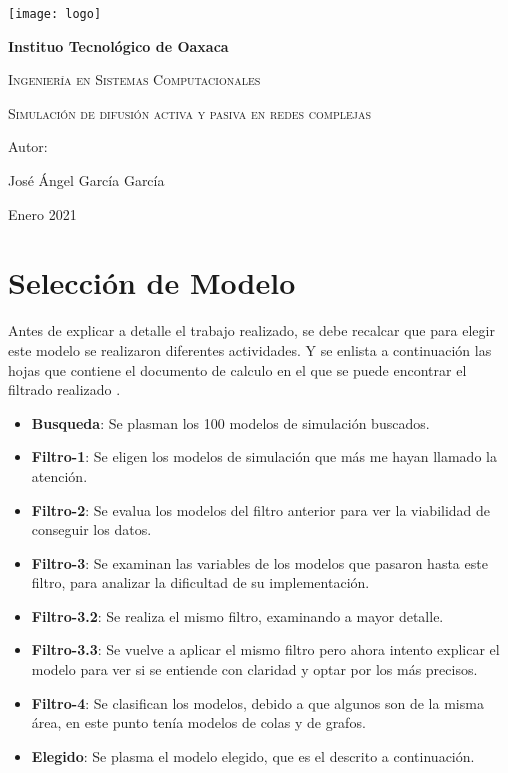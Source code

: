 \documentclass{article}
\begin{document}
		
	\begin{titlepage}
		\centering
		{\texttt{[image: logo]}\par}
		\vspace{1cm}
		{\bfseries\LARGE Instituo Tecnológico de Oaxaca \par}
		\vspace{1cm}
		{\scshape\Large Ingeniería en Sistemas Computacionales  \par}
		\vspace{1cm}
		{\scshape\Huge Simulación de difusión activa y pasiva en redes
			complejas \par}
		\vspace{3cm}
		\vfill
		{\Large Autor: \par}
		{\Large José Ángel García García \par}
		\vfill
		{\Large Enero 2021 \par}
		\end{titlepage}
	
\tableofcontents
\newpage
	
\section{Selección de Modelo}	
Antes de explicar a detalle el trabajo realizado, se debe recalcar que para elegir este modelo se realizaron diferentes actividades. Y se enlista a continuación las hojas que contiene el documento de calculo en el que se puede encontrar el filtrado realizado \cite{filtros:2020}.
\begin{itemize}
	\item \textbf{Busqueda}: Se plasman los 100 modelos de simulación buscados.
	\item \textbf{Filtro-1}: Se eligen los modelos de simulación que más me hayan llamado la atención.
	\item \textbf{Filtro-2}: Se evalua los modelos del filtro anterior para ver la viabilidad de conseguir los datos.
	\item \textbf{Filtro-3}: Se examinan las variables de los modelos que pasaron hasta este filtro, para analizar la dificultad de su implementación.
	\item \textbf{Filtro-3.2}: Se realiza el mismo filtro, examinando a mayor detalle.
	\item \textbf{Filtro-3.3}: Se vuelve a aplicar el mismo filtro pero ahora intento explicar el modelo para ver si se entiende con claridad y optar por los más precisos.
	\item \textbf{Filtro-4}: Se clasifican los modelos, debido a que algunos son de la misma área, en este punto tenía modelos de colas y de grafos.
	\item \textbf{Elegido}: Se plasma el modelo elegido, que es el descrito a continuación.
\end{itemize}
\end{document}
